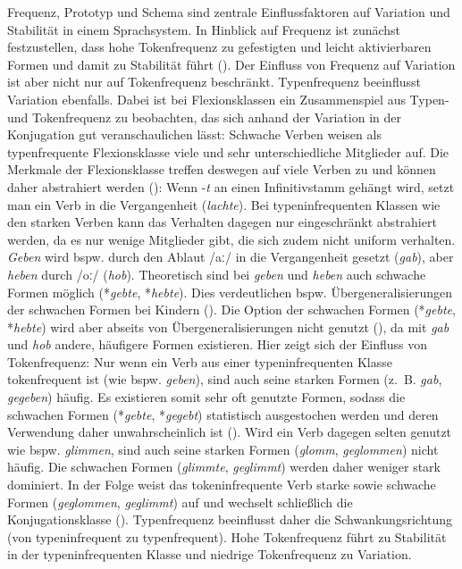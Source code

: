 Frequenz, Prototyp und Schema sind zentrale Einflussfaktoren auf Variation und Stabilität in einem Sprachsystem. In Hinblick auf Frequenz ist zunächst festzustellen, dass hohe Tokenfrequenz zu gefestigten und leicht aktivierbaren Formen und damit zu Stabilität führt (\cite[380]{Bybee.1997}). Der Einfluss von Frequenz auf Variation ist aber nicht nur auf Tokenfrequenz beschränkt. Typenfrequenz beeinflusst Variation ebenfalls. Dabei ist bei Flexionsklassen ein Zusammenspiel aus Typen- und Tokenfrequenz zu beobachten, das sich anhand der Variation in der Konjugation gut veranschaulichen lässt: Schwache Verben weisen als typenfrequente Flexionsklasse viele und sehr unterschiedliche Mitglieder auf. Die Merkmale der Flexionsklasse treffen deswegen auf viele Verben zu und können daher abstrahiert werden (\cites[384]{Bybee.1997}[63--67]{Goldberg.2019}): Wenn -\textit{t} an einen Infinitivstamm gehängt wird, setzt man ein Verb in die Vergangenheit (\textit{lachte}). Bei typeninfrequenten Klassen wie den starken Verben kann das Verhalten dagegen nur eingeschränkt abstrahiert werden, da es nur wenige Mitglieder gibt, die sich zudem nicht uniform verhalten. \textit{Geben} wird bspw. durch den Ablaut /aː/ in die Vergangenheit gesetzt (\textit{gab}), aber \textit{heben} durch /oː/ (\textit{hob}). Theoretisch sind bei \textit{geben} und \textit{heben} auch schwache Formen möglich (*\textit{gebte}, *\textit{hebte}). Dies verdeutlichen bspw. Übergeneralisierungen der schwachen Formen bei Kindern (\cite[219--220]{Rumelhart.1986}). Die Option der schwachen Formen (*\textit{gebte}, *\textit{hebte}) wird aber abseits von Übergeneralisierungen nicht genutzt (\cite[75--77]{Goldberg.2019}), da mit \textit{gab} und \textit{hob} andere, häufigere Formen existieren. Hier zeigt sich der Einfluss von Tokenfrequenz: Nur wenn ein Verb aus einer typeninfrequenten Klasse tokenfrequent ist (wie bspw. \textit{geben}), sind auch seine starken Formen (z.~B. \textit{gab}, \textit{gegeben}) häufig. Es existieren somit sehr oft genutzte Formen, sodass die schwachen Formen (*\textit{gebte}, *\textit{gegebt}) statistisch ausgestochen werden und deren Verwendung daher unwahrscheinlich ist (\cite[83--84]{Goldberg.2019}). Wird ein Verb dagegen selten genutzt wie bspw. \textit{glimmen}, sind auch seine starken Formen (\textit{glomm}, \textit{geglommen}) nicht häufig. Die schwachen Formen (\textit{glimmte}, \textit{geglimmt}) werden daher weniger stark dominiert. In der Folge weist das tokeninfrequente Verb starke sowie schwache Formen (\textit{geglommen}, \textit{geglimmt}) auf und wechselt schließlich die Konjugationsklasse (\cite[267--268]{Augst.1975}). Typenfrequenz beeinflusst daher die Schwankungsrichtung (von typeninfrequent zu typenfrequent). Hohe Tokenfrequenz führt zu Stabilität in der typeninfrequenten Klasse und niedrige Tokenfrequenz zu Variation.

